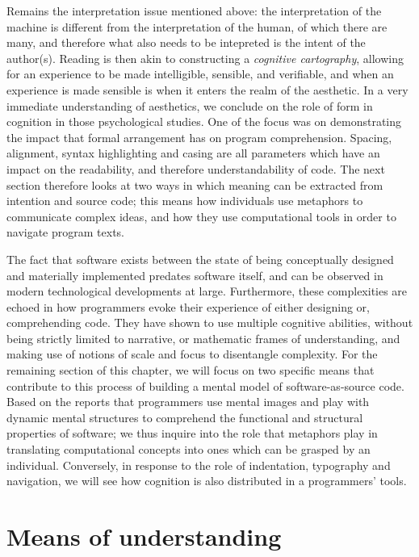 Remains the interpretation issue mentioned above: the interpretation of the machine is different from the interpretation of the human, of which there are many, and therefore what also needs to be intepreted is the intent of the author(s). Reading is then akin to constructing a \emph{cognitive cartography}, allowing for an experience to be made intelligible, sensible, and verifiable, and when an experience is made sensible is when it enters the realm of the aesthetic. In a very immediate understanding of aesthetics, we conclude on the role of form in cognition in those psychological studies. One of the focus was on demonstrating the impact that formal arrangement has on program comprehension\citep{oman_typographic_1990,oliveira_systematic_2022}. Spacing, alignment, syntax highlighting and casing are all parameters which have an impact on the readability, and therefore understandability of code. The next section therefore looks at two ways in which meaning can be extracted from intention and source code; this means how individuals use metaphors to communicate complex ideas, and how they use computational tools in order to navigate program texts.


The fact that software exists between the state of being conceptually designed and materially implemented predates software itself, and can be observed in modern technological developments at large. Furthermore, these complexities are echoed in how programmers evoke their experience of either designing or, comprehending code. They have shown to use multiple cognitive abilities, without being strictly limited to narrative, or mathematic frames of understanding, and making use of notions of scale and focus to disentangle complexity. For the remaining section of this chapter, we will focus on two specific means that contribute to this process of building a mental model of software-as-source code. Based on the reports that programmers use mental images and play with dynamic mental structures to comprehend the functional and structural properties of software; we thus inquire into the role that metaphors play in translating computational concepts into ones which can be grasped by an individual. Conversely, in response to the role of indentation, typography and navigation, we will see how cognition is also distributed in a programmers' tools.

\clearpage

\section{Means of understanding}

